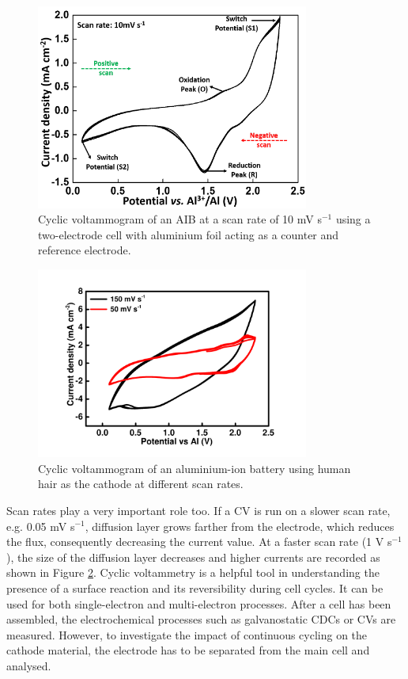 \begin{figure}[tbh!]
\centering
\includegraphics[width=0.8\textwidth]{Figures/chap2fig/CV.pdf}
\caption{Cyclic voltammogram of an AIB at a scan rate of 10 mV s$^{-1}$ using a two-electrode cell with aluminium foil acting as a counter and reference electrode.}
\label{Figures/chap2fig:CV}
\end{figure}

\begin{figure}[tbh!]
\centering
\includegraphics[width=0.8\textwidth]{Figures/chap2fig/scanrate.pdf}
\caption{Cyclic voltammogram of an aluminium-ion battery using human hair as the cathode at different scan rates.}
\label{Figures/chap2fig:scanrate}
\end{figure}

Scan rates play a very important role too. If a CV is run on a slower scan rate, e.g. 0.05 mV s$^{-1}$, diffusion layer grows farther from the electrode, which reduces the flux, consequently decreasing the current value. At a faster scan rate (1 V s$^{-1}$), the size of the diffusion layer decreases and higher currents are recorded as shown in Figure \ref{Figures/chap2fig:scanrate}. Cyclic voltammetry is a helpful tool in understanding the presence of a surface reaction and its reversibility during cell cycles. It can be used for both single-electron and multi-electron processes.  
After a cell has been assembled, the electrochemical processes such as galvanostatic CDCs or CVs are measured. However, to investigate the impact of continuous cycling on the cathode material, the electrode has to be separated from the main cell and analysed. 

